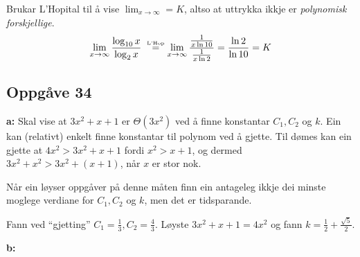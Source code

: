 \documentclass[a4paper, 11pt]{article}
\newcommand{\ceq}[2]{\stackrel{\text{\tiny{#1}}}{#2}}
\newcommand{\deloppg}[1]{\vspace{1mm}\noindent \textbf{\themecolor{#1:}}}
\newcommand{\themeshade}{Mahogany}
\newcommand{\themecolor}[1]{\textcolor{\themeshade}{#1}}
\begin{document}
\noindent Brukar L'Hopital til å vise \(\lim_{x \rightarrow \infty} = K\), altso at uttrykka ikkje
er {\em polynomisk forskjellige}.
\begin{align*}
    \lim_{x \rightarrow \infty} \frac{\log_{10}x}{\log_2 x}
        \;\ceq{L'Hop}{=} \lim_{x \rightarrow \infty} \frac{\frac{1}{x\ln 10}}{\frac{1}{x \ln 2}}
        = \frac{\ln 2}{\ln 10}
        = K
\end{align*}

\newpage
\subsection*{Oppgåve 34}

\deloppg{a} Skal vise at \(3x^2 + x + 1\) er \(\Theta(3x^2)\) ved å finne
konstantar \(C_1, C_2\) og \(k\).
Ein kan (relativt) enkelt finne konstantar til polynom ved å gjette.
Til dømes kan ein gjette at \(4x^2 > 3x^2 + x + 1\) fordi \(x^2 > x + 1\), og dermed
\(3x^2 + x^2 > 3x^2 + (x + 1)\), når \(x\) er stor nok.

Når ein løyser oppgåver på denne måten finn ein antageleg ikkje dei minste moglege verdiane for
\(C_1, C_2\) og \(k\), men det er tidsparande.

\vspace{3mm}
\noindent Fann ved ``gjetting'' \( C_1 = \frac{1}{3}, C_2 = \frac{4}{3}\). 
Løyste \(3x^2 + x + 1 = 4x^2\) og fann \(k = \frac{1}{2} + \frac{\sqrt{5}}{2}\).

\deloppg{b}
\begin{figure}[h]
    \centering
\end{figure}
\end{document}
